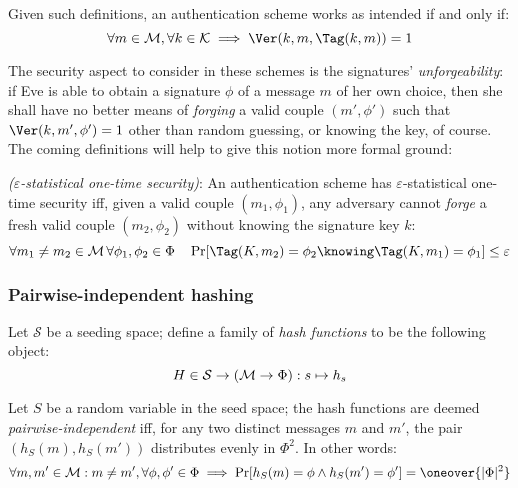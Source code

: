 Given such definitions, an authentication scheme works as intended if and only if:
\[
    \forall m \in \M, \forall k \in \K \implies \Ver(k, m, \Tag(k, m)) = 1
\]

The security aspect to consider in these schemes is the signatures' \emph{unforgeability}: if Eve is able to obtain a signature $\phi$ of a message $m$ of her own choice, then she shall have no better means of \emph{forging} a valid couple $(m', \phi')$ such that $\Ver(k, m', \phi') = 1$ other than random guessing, or knowing the key, of course. The coming definitions will help to give this notion more formal ground:

\begin{definition} \emph{($\varepsilon$-statistical one-time security)}:
    An authentication scheme has $\varepsilon$-statistical one-time security iff, given a valid couple $(m_1, \phi_1)$, any adversary cannot \emph{forge} a fresh valid couple $(m_2, \phi_2)$ without knowing the signature key $k$:
    \[
        \forall m_1 \neq m_2 \in \M \, \forall \phi_1, \phi_2 \in \Phi \quad \Pr[\Tag(K, m_2) = \phi_2 \knowing \Tag(K, m_1) = \phi_1] \leq \varepsilon
    \]
\end{definition}

\subsubsection{Pairwise-independent hashing}

\begin{definition}
    Let $\mathcal{S}$ be a seeding space; define a family of \emph{hash functions} to be the following object\footnotemark:
    \[
        H \in \mathcal{S} \to (\mathcal{M} \to \Phi) : s \mapsto h_s
    \]


    Let $S$ be a random variable in the seed space; the hash functions are deemed \emph{pairwise-independent}\footnotemark{} iff, for any two distinct messages $m$ and $m'$, the pair $(h_S(m), h_S(m'))$ distributes evenly in $\Phi^2$. In other words:
    \[
        \forall m, m' \in \M : m \neq m', \forall \phi, \phi' \in \Phi \implies \Pr[h_S(m) = \phi \wedge h_S(m') = \phi'] = \oneover{|\Phi|^2}
    \]
\end{definition}

